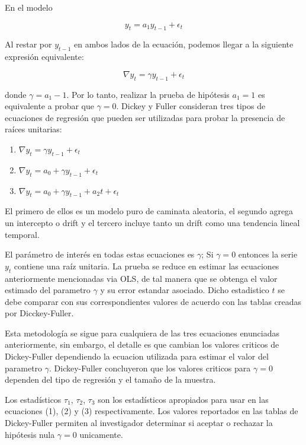 \documentclass[]{book}
\providecommand{\tightlist}{%
  \setlength{\itemsep}{0pt}\setlength{\parskip}{0pt}}
\theoremstyle{definition}
\theoremstyle{definition}
\theoremstyle{definition}
\theoremstyle{remark}
\begin{document}
En el modelo

\[ y_t = a_1y_{t-1}+\epsilon_t\]

Al restar por \(y_{t-1}\) en ambos lados de la ecuación, podemos llegar
a la siguiente expresión equivalente:

\[ \nabla y_t =  \gamma y_{t-1}+\epsilon_t\]

donde \(\gamma = a_1-1\). Por lo tanto, realizar la prueba de hipótesis
\(a_1=1\) es equivalente a probar que \(\gamma=0\). Dickey y Fuller
consideran tres tipos de ecuaciones de regresión que pueden ser
utilizadas para probar la presencia de raíces unitarias:

\begin{enumerate}
\def\labelenumi{\arabic{enumi})}
\tightlist
\item
  \(\nabla y_t = \gamma y_{t-1} + \epsilon_t\)
\item
  \(\nabla y_t = a_0 + \gamma y_{t-1} + \epsilon_t\)
\item
  \(\nabla y_t = a_0 + \gamma y_{t-1} + a_2t + \epsilon_t\)
\end{enumerate}

El primero de ellos es un modelo puro de caminata aleatoria, el segundo
agrega un intercepto o drift y el tercero incluye tanto un drift como
una tendencia lineal temporal.

El parámetro de interés en todas estas ecuaciones es \(\gamma\); Si
\(\gamma=0\) entonces la serie \(y_t\) contiene una raíz unitaria. La
prueba se reduce en estimar las ecuaciones anteriormente mencionadas via
OLS, de tal manera que se obtenga el valor estimado del parametro
\(\gamma\) y su error estandar asociado. Dicho estadistico \(t\) se debe
comparar con sus correspondientes valores de acuerdo con las tablas
creadas por Dicckey-Fuller.

Esta metodología se sigue para cualquiera de las tres ecuaciones
enunciadas anteriormente, sin embargo, el detalle es que cambian los
valores criticos de Dickey-Fuller dependiendo la ecuacion utilizada para
estimar el valor del parametro \(\gamma\). Dickey-Fuller concluyeron que
los valores criticos para \(\gamma=0\) dependen del tipo de regresión y
el tamaño de la muestra.

Los estadísticos \(\tau_1\), \(\tau_2\), \(\tau_3\) son los estadísticos
apropiados para usar en las ecuaciones (1), (2) y (3) respectivamente.
Los valores reportados en las tablas de Dickey-Fuller permiten al
investigador determinar si aceptar o rechazar la hipótesis nula
\(\gamma=0\) unicamente.
\end{document}
